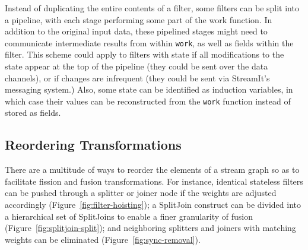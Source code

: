 Instead of duplicating the entire contents of a filter, some filters
can be split into a pipeline, with each stage performing some part of
the work function.  In addition to the original input data, these
pipelined stages might need to communicate intermediate results from
within {\tt work}, as well as fields within the filter.  This scheme
could apply to filters with state if all modifications to the state
appear at the top of the pipeline (they could be sent over the data
channels), or if changes are infrequent (they could be sent via
StreamIt's messaging system.)  Also, some state can be identified as
induction variables, in which case their values can be reconstructed
from the {\tt work} function instead of stored as fields.

\subsection{Reordering Transformations}

There are a multitude of ways to reorder the elements of a stream
graph so as to facilitate fission and fusion transformations.  For
instance, identical stateless filters can be pushed through a splitter
or joiner node if the weights are adjusted accordingly
(Figure~\ref{fig:filter-hoisting}); a SplitJoin construct can be
divided into a hierarchical set of SplitJoins to enable a finer
granularity of fusion (Figure~\ref{fig:splitjoin-split}); and
neighboring splitters and joiners with matching weights can be
eliminated (Figure~\ref{fig:sync-removal}).

